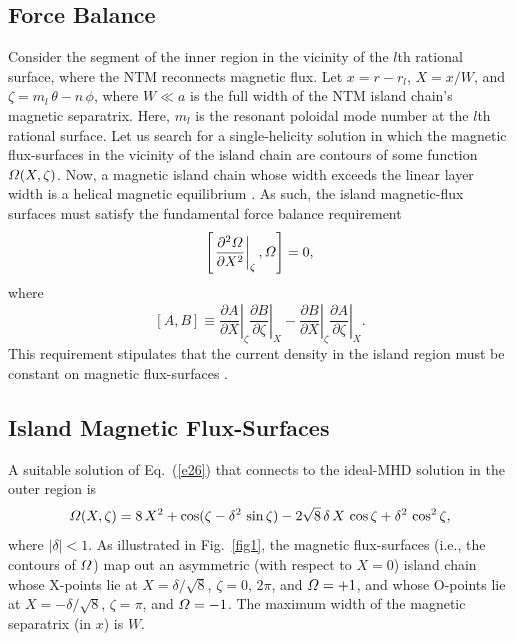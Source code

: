 \documentclass{iopjournal}
\begin{document}
{\subsection{Force Balance}
Consider the segment of the inner region in the vicinity of the $l$th rational surface, where the NTM reconnects magnetic flux. 
Let $x=r-r_{l}$, $X=x/W$, and $\zeta=m_{l}\,\theta-n\,\phi$, where $W\ll a$ is the full width  of the NTM island chain's magnetic separatrix. 
Here, $m_l$ is the resonant poloidal mode number at the $l$th rational surface. 
Let us search for a single-helicity solution in which the magnetic flux-surfaces in the vicinity of the island chain are contours of some function ${\mit\Omega}(X,\zeta)$.
Now, a magnetic island chain whose width exceeds the linear layer width is a helical magnetic equilibrium \cite{ntm1}. As such, the island magnetic-flux surfaces must satisfy the fundamental
force balance requirement \cite{island}
\begin{equation}\label{e26}
\left[\left.\frac{\partial^2{\mit\Omega}}{\partial X^2}\right|_\zeta,{\mit\Omega}\right]=0,
\end{equation}
where
\begin{equation}\label{poisson}
[A,B] \equiv \left.\frac{\partial A}{\partial X}\right|_\zeta \left.\frac{\partial B}{\partial\zeta}\right|_X- \left.\frac{\partial B}{\partial X}\right|_\zeta \left.\frac{\partial A}{\partial\zeta}\right|_X.
\end{equation}
This requirement stipulates that the current density in the island region must be constant on magnetic flux-surfaces \cite{ntm1,multi}.

\subsection{Island Magnetic Flux-Surfaces}
A suitable solution of Eq.~(\ref{e26}) that connects to the ideal-MHD solution in the outer region is \cite{island}
\begin{equation}\label{e45}
{\mit\Omega}(X,\zeta) = 8\,X^2 + \cos(\zeta-\delta^2\,\sin\zeta) - 2\sqrt{8}\,\delta\,X\,\cos\zeta+\delta^2\,\cos^2\zeta,
\end{equation}
where $|\delta|<1$.  As illustrated in Fig.~\ref{fig1}, the magnetic flux-surfaces  (i.e., the contours of ${\mit\Omega}$) map out an
asymmetric (with respect to $X=0$) island chain whose 
X-points lie at $X=\delta/\sqrt{8}$, $\zeta = 0$, $2\pi$, and ${\mit\Omega}=+1$,  and whose  O-points lie at
$X=-\delta/\sqrt{8}$,  $\zeta=\pi$, and ${\mit\Omega}=-1$. The maximum width of the magnetic separatrix (in $x$) is $W$. 

}
\end{document}
